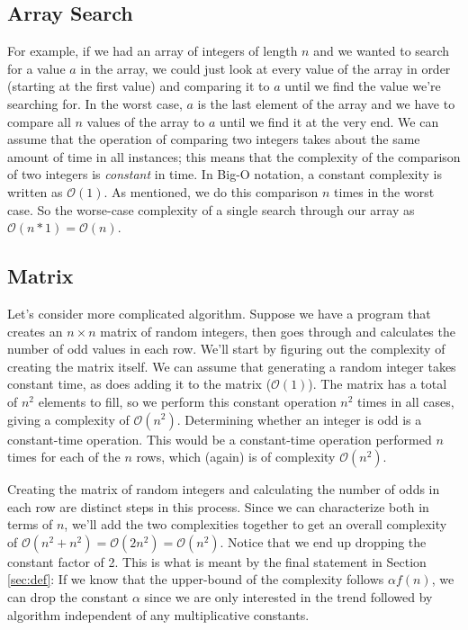 \documentclass[11pt]{article}
\begin{document}
\subsection{Array Search}
For example, if we had an array of integers of length $n$ and we wanted to
search for a value $a$ in the array, we could just look at every value of the
array in order (starting at the first value) and comparing it to $a$ until we
find the value we're searching for. In the worst case, $a$ is the last element
of the array and we have to compare all $n$ values of the array to $a$ until we
find it at the very end. We can assume that the operation of comparing two
integers takes about the same amount of time in all instances; this means that
the complexity of the comparison of two integers is \textit{constant} in time.
In Big-O notation, a constant complexity is written as $\mathcal{O}(1)$. As
mentioned, we do this comparison $n$ times in the worst case. So the worse-case
complexity of a single search through our array as $\mathcal{O}(n * 1) =
\mathcal{O}(n)$.

\subsection{Matrix}
Let's consider more complicated algorithm. Suppose we have a program that
creates an $n \times n$ matrix of random integers, then goes through and
calculates the number of odd values in each row. We'll start by figuring out the
complexity of creating the matrix itself. We can assume that generating a random
integer takes constant time, as does adding it to the matrix ($\mathcal{O}(1)$).
The matrix has a total of $n^2$ elements to fill, so we perform this constant
operation $n^2$ times in all cases, giving a complexity of $\mathcal{O}(n^2)$.
Determining whether an integer is odd is a constant-time operation. This would
be a constant-time operation performed $n$ times for each of the $n$ rows, which
(again) is of complexity $\mathcal{O}(n^2)$.

Creating the matrix of random integers and calculating the number of odds in
each row are distinct steps in this process. Since we can characterize both in
terms of $n$, we'll add the two complexities together to get an overall
complexity of $\mathcal{O}(n^2 + n^2) = \mathcal{O}(2n^2) = \mathcal{O}(n^2)$.
Notice that we end up dropping the constant factor of 2. This is what is meant
by the final statement in Section \ref{sec:def}: If we know that the upper-bound
of the complexity follows $\alpha f(n)$, we can drop the constant $\alpha$ since
we are only interested in the trend followed by algorithm independent of any
multiplicative constants.
\end{document}
